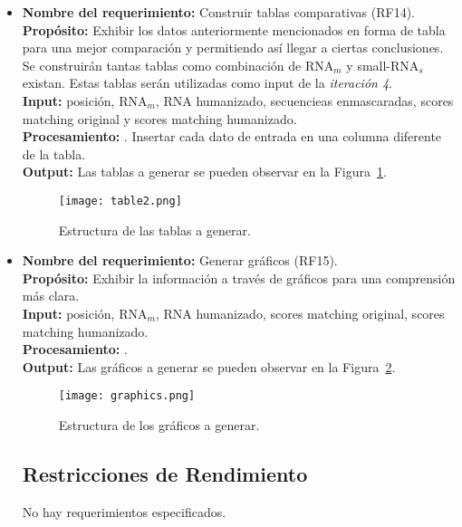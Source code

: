 \documentclass[12pt,a4paper,spanish]{article}
\begin{document}
\begin{itemize}
		\item \textbf{Nombre del requerimiento:} Construir tablas comparativas (RF14).\\
 	    \textbf{Propósito:} Exhibir los datos anteriormente mencionados en forma de tabla para una mejor comparación y 								permitiendo así llegar a ciertas conclusiones. Se construirán tantas tablas como combinación 								de RNA$_m$ y small-RNA$_s$ existan. Estas tablas serán utilizadas como input de la
							\emph{iteración 4}.\\
		\textbf{Input:} posición, RNA$_m$, RNA humanizado, secuencieas enmascaradas, scores matching original y scores 							matching humanizado.\\
		\textbf{Procesamiento:} . Insertar cada dato de entrada en una columna diferente de la tabla.\\
		\textbf{Output:} Las tablas a generar se pueden observar en la Figura~\ref{table}.
			\vskip 0.5cm
			\begin{figure}[h]
				\begin{center}
					\texttt{[image: table2.png]}
					\caption{Estructura de las tablas a generar.}
					\label{table}
				\end{center}
			\end{figure}
		
		\item \textbf{Nombre del requerimiento:} Generar gráficos (RF15).\\
 	    \textbf{Propósito:} Exhibir la información a través de gráficos para una comprensión más clara.\\
		\textbf{Input:} posición, RNA$_m$, RNA humanizado, scores matching original, scores matching humanizado. \\
		\textbf{Procesamiento:} .\\
		\textbf{Output:} Las gráficos a generar se pueden observar en la Figura~\ref{graphic}.
			\begin{figure}[h]
				\begin{center}
					\texttt{[image: graphics.png]}
					\caption{Estructura de los gráficos a generar.}
					\label{graphic}
				\end{center}
			\end{figure}

\subsection{Restricciones de Rendimiento}
No hay requerimientos especificados.


\end{itemize}
\end{document}
